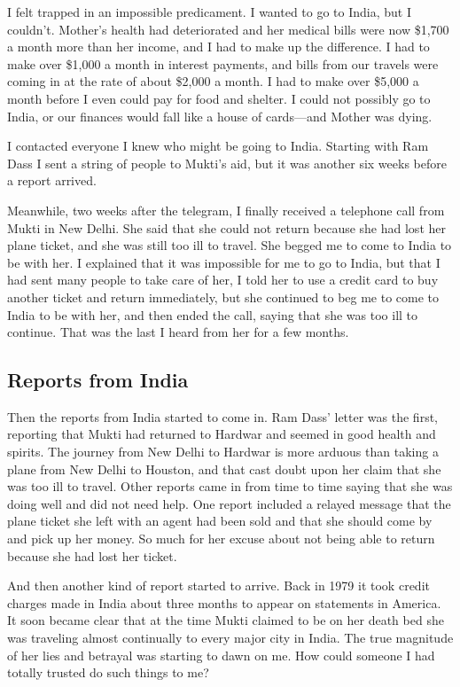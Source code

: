 \documentclass[a5paper,10pt,english]{book}
\begin{document}
\sphinxAtStartPar
I felt trapped in an impossible predicament. I wanted to go to India,
but I couldn’t. Mother’s health had deteriorated and her medical bills
were now \$1,700 a month more than her income, and I had to make up the
difference. I had to make over \$1,000 a month in interest payments, and
bills from our travels were coming in at the rate of about \$2,000 a
month. I had to make over \$5,000 a month before I even could pay for
food and shelter. I could not possibly go to India, or our finances
would fall like a house of cards—and Mother was dying.

\sphinxAtStartPar
I contacted everyone I knew who might be going to India. Starting with
Ram Dass I sent a string of people to Mukti’s aid, but it was another
six weeks before a report arrived.

\sphinxAtStartPar
Meanwhile, two weeks after the telegram, I finally received a telephone
call from Mukti in New Delhi. She said that she could not return because
she had lost her plane ticket, and she was still too ill to travel. She
begged me to come to India to be with her. I explained that it was
impossible for me to go to India, but that I had sent many people to
take care of her, I told her to use a credit card to buy another ticket
and return immediately, but she continued to beg me to come to India to
be with her, and then ended the call, saying that she was too ill to
continue. That was the last I heard from her for a few months.


\subsection{Reports from India}
\label{\detokenize{psychopaths:reports-from-india}}
\sphinxAtStartPar
Then the reports from India started to come in. Ram Dass’ letter was the
first, reporting that Mukti had returned to Hardwar and seemed in good
health and spirits. The journey from New Delhi to Hardwar is more
arduous than taking a plane from New Delhi to Houston, and that cast
doubt upon her claim that she was too ill to travel. Other reports came
in from time to time saying that she was doing well and did not need
help. One report included a relayed message that the plane ticket she
left with an agent had been sold and that she should come by and pick up
her money. So much for her excuse about not being able to return because
she had lost her ticket.

\sphinxAtStartPar
And then another kind of report started to arrive. Back in 1979 it took
credit charges made in India about three months to appear on statements
in America. It soon became clear that at the time Mukti claimed to be on
her death bed she was traveling almost continually to every major city
in India. The true magnitude of her lies and betrayal was starting to
dawn on me. How could someone I had totally trusted do such things to
me?
\end{document}

